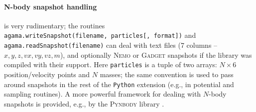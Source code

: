 \documentclass[12pt]{article}
\newcommand{\Nemo} {\textsc{Nemo}\xspace}
\newcommand{\Python}{\texttt{Python}\xspace}
\newcommand{\ppp}[1]{\textcolor{darkolive} {\texttt{#1}}}
\let\oldparagraph\paragraph
\renewcommand{\paragraph}[1]{\vspace{-2mm}\oldparagraph{#1}}
\begin{document}
\paragraph{N-body snapshot handling} \label{sec:PythonSnapshot} is very rudimentary; the routines\\
\texttt{agama.writeSnapshot(filename, particles[, format])} and\\ \texttt{agama.readSnapshot(filename)} can deal with text files (7 columns -- $x,y,z,vx,vy,vz,m$), and optionally \Nemo or \textsc{Gadget} snapshots if the library was compiled with their support. Here \ppp{particles} is a tuple of two arrays: $N\times6$ position/velocity points and $N$ masses; the same convention is used to pass around snapshots in the rest of the \Python extension (e.g., in potential and sampling routines). A more powerful framework for dealing with $N$-body snapshots is provided, e.g., by the \textsc{Pynbody} library \cite{Pynbody}.
\end{document}
